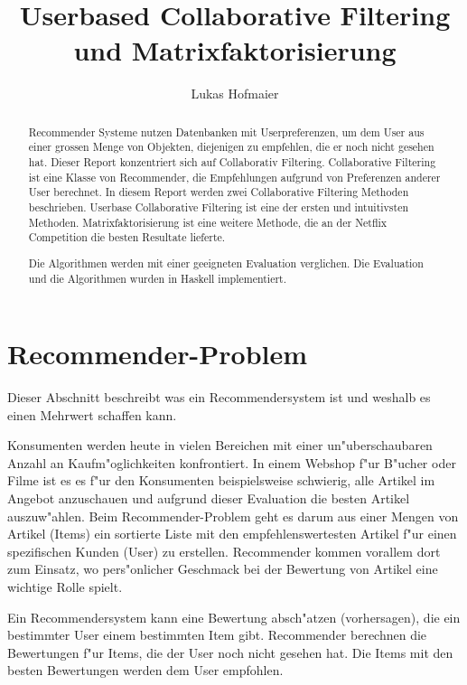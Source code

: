 \documentclass[a4paper, 12pt]{article}
\author{Lukas Hofmaier}
\title{Userbased Collaborative Filtering und Matrixfaktorisierung}
\begin{document}
\lstset{basicstyle=\small,
language=Haskell,
stringstyle=ttfamiliy
}

\maketitle
\newpage
\tableofcontents
\newpage
\begin{abstract}
  Recommender Systeme nutzen Datenbanken mit Userpreferenzen, um dem User aus einer grossen Menge von Objekten, diejenigen zu empfehlen, die er noch nicht gesehen hat. Dieser Report konzentriert sich auf Collaborativ Filtering. Collaborative Filtering ist eine Klasse von Recommender, die Empfehlungen aufgrund von Preferenzen anderer User berechnet.
In diesem Report werden zwei Collaborative Filtering Methoden beschrieben. Userbase Collaborative Filtering ist eine der ersten und intuitivsten Methoden. Matrixfaktorisierung ist eine weitere Methode, die an der Netflix Competition die besten Resultate lieferte.

Die Algorithmen werden mit einer geeigneten Evaluation verglichen. Die Evaluation und die Algorithmen wurden in Haskell implementiert.

\end{abstract}

\section{Recommender-Problem}
\label{sec:problem}
Dieser Abschnitt beschreibt was ein Recommendersystem ist und weshalb es einen Mehrwert schaffen kann.

Konsumenten werden heute in vielen Bereichen mit einer un"uberschaubaren Anzahl an Kaufm"oglichkeiten konfrontiert. In einem Webshop f"ur B"ucher oder Filme ist es es f"ur den Konsumenten beispielsweise schwierig, alle Artikel im Angebot anzuschauen und aufgrund dieser Evaluation die besten Artikel auszuw"ahlen. Beim Recommender-Problem geht es darum aus einer Mengen von Artikel (Items) ein sortierte Liste mit den empfehlenswertesten Artikel f"ur einen spezifischen Kunden (User) zu erstellen. Recommender kommen vorallem dort zum Einsatz, wo pers"onlicher Geschmack bei der Bewertung von Artikel eine wichtige Rolle spielt.

Ein Recommendersystem kann eine Bewertung absch"atzen (vorhersagen), die ein bestimmter User einem bestimmten Item gibt. Recommender berechnen die Bewertungen f"ur Items, die der User noch nicht gesehen hat. Die Items mit den besten Bewertungen werden dem User empfohlen.
\end{document}
